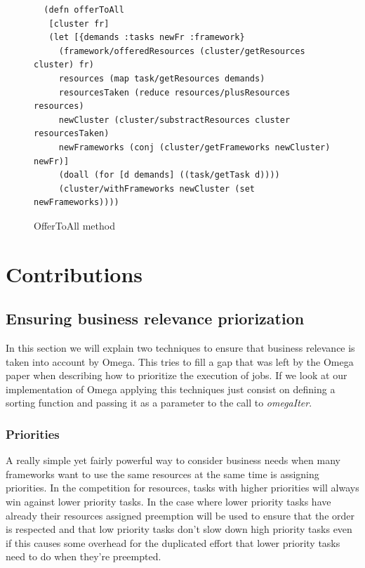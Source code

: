 \documentclass{report}                     %
\begin{document}
\begin{figure}[!ht]
\centering
\begin{verbatim}
  (defn offerToAll
   [cluster fr]
   (let [{demands :tasks newFr :framework}
     (framework/offeredResources (cluster/getResources cluster) fr)
     resources (map task/getResources demands)
     resourcesTaken (reduce resources/plusResources resources)
     newCluster (cluster/substractResources cluster resourcesTaken)
     newFrameworks (conj (cluster/getFrameworks newCluster) newFr)]
     (doall (for [d demands] ((task/getTask d))))
     (cluster/withFrameworks newCluster (set newFrameworks))))

\end{verbatim}

\caption{OfferToAll method}
\label{fig:mesos-offerToAll}
\end{figure}

\chapter{Contributions}

\section{Ensuring business relevance priorization}

In this section we will explain two techniques to ensure that business
relevance is taken into account by Omega. This tries to fill a gap
that was left by the Omega paper when describing how to prioritize the
execution of jobs. If we look at our implementation of Omega applying
this techniques just consist on defining a sorting function and
passing it as a parameter to the call to \emph{omegaIter}.

\label{sec:businessrelevance}

\subsection{Priorities}

A really simple yet fairly powerful way to consider business needs
when many frameworks want to use the same resources at the same time
is assigning priorities. In the competition for resources, tasks with
higher priorities will always win against lower priority tasks. In the
case where lower priority tasks have already their resources assigned
preemption will be used to ensure that the order is respected and that
low priority tasks don't slow down high priority tasks even if this
causes some overhead for the duplicated effort that lower priority
tasks need to do when they're preempted.
\end{document}
